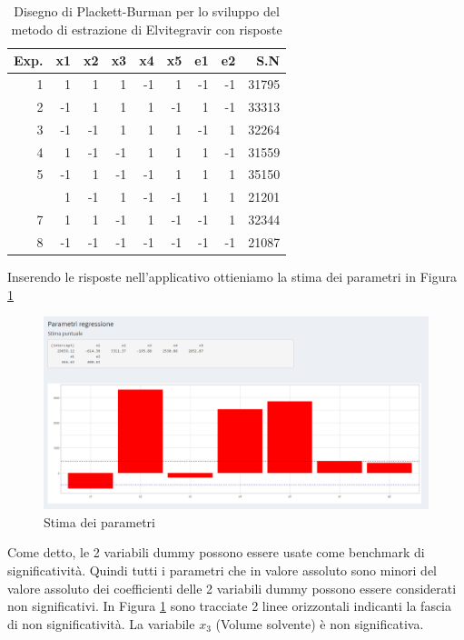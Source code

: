 \documentclass[
  11pt,
]{book}
\begin{document}
\begin{table}

\caption{\label{tab:pbes2}Disegno di Plackett-Burman per lo sviluppo del metodo di estrazione di Elvitegravir con risposte}
\centering
\begin{tabular}[t]{rrrrrrrrr}
\toprule
Exp. & x1 & x2 & x3 & x4 & x5 & e1 & e2 & S.N\\
\midrule
1 & 1 & 1 & 1 & -1 & 1 & -1 & -1 & 31795\\
2 & -1 & 1 & 1 & 1 & -1 & 1 & -1 & 33313\\
3 & -1 & -1 & 1 & 1 & 1 & -1 & 1 & 32264\\
4 & 1 & -1 & -1 & 1 & 1 & 1 & -1 & 31559\\
5 & -1 & 1 & -1 & -1 & 1 & 1 & 1 & 35150\\
\addlinespace
6 & 1 & -1 & 1 & -1 & -1 & 1 & 1 & 21201\\
7 & 1 & 1 & -1 & 1 & -1 & -1 & 1 & 32344\\
8 & -1 & -1 & -1 & -1 & -1 & -1 & -1 & 21087\\
\bottomrule
\end{tabular}
\end{table}

\newpage

Inserendo le risposte nell'applicativo ottieniamo la stima dei parametri in Figura \ref{fig:pb5}

\begin{figure}[ht]

{\centering \includegraphics[width=1\linewidth]{Immagini/PB/05_coeff1} 

}

\caption{Stima dei parametri}\label{fig:pb5}
\end{figure}

Come detto, le 2 variabili dummy possono essere usate come benchmark di significatività. Quindi tutti i parametri che in valore assoluto sono minori del valore assoluto dei coefficienti delle 2 variabili dummy possono essere considerati non significativi. In Figura \ref{fig:pb5} sono tracciate 2 linee orizzontali indicanti la fascia di non significatività. La variabile \(x_3\) (Volume solvente) è non significativa.
\end{document}
